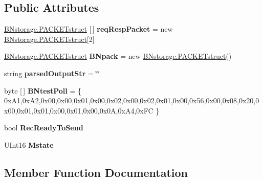 \subsection*{Public Attributes}
\begin{DoxyCompactItemize}
\item 
\mbox{\label{class_b_n_a30_1_1_net_anal_b_n_a4ad89c13644164947837b1ea8b125f75}} 
\mbox{\hyperlink{struct_b_n_a30_1_1_b_nstorage_1_1_p_a_c_k_e_tstruct}{B\+Nstorage.\+P\+A\+C\+K\+E\+Tstruct}} \mbox{[}$\,$\mbox{]} {\bfseries req\+Resp\+Packet} = new \mbox{\hyperlink{struct_b_n_a30_1_1_b_nstorage_1_1_p_a_c_k_e_tstruct}{B\+Nstorage.\+P\+A\+C\+K\+E\+Tstruct}}\mbox{[}2\mbox{]}
\item 
\mbox{\label{class_b_n_a30_1_1_net_anal_b_n_aef85a26dcfd7b3598fca9aa08902c90f}} 
\mbox{\hyperlink{struct_b_n_a30_1_1_b_nstorage_1_1_p_a_c_k_e_tstruct}{B\+Nstorage.\+P\+A\+C\+K\+E\+Tstruct}} {\bfseries B\+Npack} = new \mbox{\hyperlink{struct_b_n_a30_1_1_b_nstorage_1_1_p_a_c_k_e_tstruct}{B\+Nstorage.\+P\+A\+C\+K\+E\+Tstruct}}()
\item 
\mbox{\label{class_b_n_a30_1_1_net_anal_b_n_a531de0d104d41bfe916466306d4edecf}} 
string {\bfseries parsed\+Output\+Str} = \char`\"{}\char`\"{}
\item 
\mbox{\label{class_b_n_a30_1_1_net_anal_b_n_a483632b7503a03e13d5d8892b735694a}} 
byte \mbox{[}$\,$\mbox{]} {\bfseries B\+Ntest\+Poll} = \{ 0x\+A1,0x\+A2,0x00,0x00,0x01,0x00,0x02,0x00,0x02,0x01,0x00,0x56,0x00,0x08,0x20,0x00,0x01,0x01,0x00,0x01,0x00,0x0\+A,0x\+A4,0x\+F\+C \}
\item 
\mbox{\label{class_b_n_a30_1_1_net_anal_b_n_aa0c3edf471b134685374298bd8f4d25a}} 
bool {\bfseries Rec\+Ready\+To\+Send}
\item 
\mbox{\label{class_b_n_a30_1_1_net_anal_b_n_ac889d4bbe35810d22a5e66d87f636f7b}} 
U\+Int16 {\bfseries Mstate}
\end{DoxyCompactItemize}


\subsection{Member Function Documentation}
\mbox{\label{class_b_n_a30_1_1_net_anal_b_n_acbc0bcad46138f72d5cc61bce3dae2ac}} 
